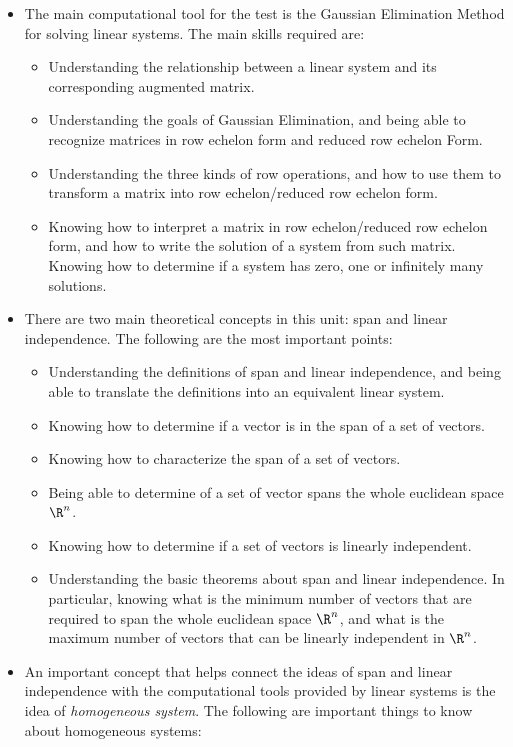 \documentclass[12pt]{article}
\begin{document}
\begin{itemize}
\item The main computational tool for the test is the Gaussian Elimination Method for solving linear systems. The main skills required are:
\begin{itemize}
\item Understanding the relationship between a linear system and its corresponding augmented matrix.
\item Understanding the goals of Gaussian Elimination, and being able to recognize matrices in row echelon form and reduced row echelon Form.
\item Understanding the three kinds of row operations, and how to use them to transform a matrix into row echelon/reduced row echelon form.
\item Knowing how to interpret a matrix in row echelon/reduced row echelon form, and how to write the solution of a system from such matrix. Knowing how to determine if a system has zero, one or infinitely many solutions.
\end{itemize}
\item There are two main theoretical concepts in this unit: span and linear independence. The following are the most important points:
\begin{itemize}
\item Understanding the definitions of span and linear independence, and being able to translate the definitions into an equivalent linear system.
\item Knowing how to determine if a vector is in the span of a set of vectors.
\item Knowing how to characterize the span of a set of vectors.
\item Being able to determine of a set of vector spans the whole euclidean space $\R^n$.
\item Knowing how to determine if a set of vectors is linearly independent.
\item Understanding the basic theorems about span and linear independence. In particular, knowing what is the minimum number of vectors that are required to span the whole euclidean space $\R^n$, and what is the maximum number of vectors that can be linearly independent in $\R^n$.
\end{itemize}
\item An important concept that helps connect the ideas of span and linear independence with the computational tools provided by linear systems is the idea of \emph{homogeneous system}. The following are important things to know about homogeneous systems:

\end{itemize}
\end{document}
